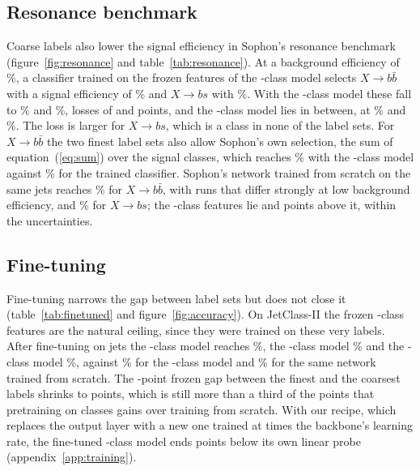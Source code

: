 \subsection{Resonance benchmark}\label{sec:resonance}

Coarse labels also lower the signal efficiency in Sophon's resonance benchmark (figure~\ref{fig:resonance} and
table~\ref{tab:resonance}).
At a background efficiency of \VXbxEpsB\%, a classifier trained on the frozen features of the \Kfull-class model
selects $X\to b\bar b$ with a signal efficiency of \VXbbFull\% and $X\to bs$ with \VXbsFull\%.
With the \Kcoarse-class model these fall to \VXbbCoarse\% and \VXbsCoarse\%, losses of \RevDXbbCoarse{} and
\RevDXbsCoarse{} points, and the \Kmid-class model lies in between, at \VXbbMid\% and \VXbsMid\%.
The loss is larger for $X\to bs$, which is a class in none of the label sets.
For $X\to b\bar b$ the two finest label sets also allow Sophon's own selection, the sum of equation~(\ref{eq:sum}) over
the signal classes, which reaches \VXbbDirectFullOne\% with the \Kfull-class model against \VXbbFull\% for the trained
classifier.
Sophon's network trained from scratch on the same jets reaches \VXbbScratch\% for $X\to b\bar b$, with runs that differ
strongly at low background efficiency, and \VXbsScratch\% for $X\to bs$; the \Kcoarse-class features lie
\RevDXbbScratch{} and \RevDXbsScratch{} points above it, within the uncertainties.

\subsection{Fine-tuning}\label{sec:finetune}

Fine-tuning narrows the gap between label sets but does not close it (table~\ref{tab:finetuned} and
figure~\ref{fig:accuracy}).
On JetClass-II the frozen \Kfull-class features are the natural ceiling, since they were trained on these very labels.
After fine-tuning on \FtSizeESix{} jets the \Kcoarse-class model reaches \VFtJcTwoCoarse\%, the \Kmid-class model
\VFtJcTwoMid\% and the \Kres-class model \VFtJcTwoRes\%, against \VFtJcTwoFull\% for the \Kfull-class model and
\VFtJcTwoScratch\% for the same network trained from scratch.
The \VDLpJcTwoCoarse-point frozen gap between the finest and the coarsest labels shrinks to \VDFtJcTwoCoarse{} points,
which is still more than a third of the \VDFtJcTwoGain{} points that pretraining on \Kfull{} classes gains over training
from scratch.
With our recipe, which replaces the output layer with a new one trained at \MlstFtHeadMult{} times the backbone's
learning rate, the fine-tuned \Kfull-class model ends \VDCsLpGap{} points below its own linear probe
(appendix~\ref{app:training}).

